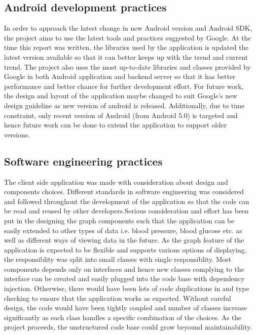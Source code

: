 \subsection{Android development practices}
In order to approach the latest change in new Android version and Android SDK, the project aims to use the latest tools
and practices suggested by Google. At the time this report was written, the libraries used by the application is updated
the latest version available so that it can better keeps up with the trend and current trend. The project also uses the
most up-to-date libraries and classes provided by Google in both Android application and backend server so that it has
better performance and better chance for further development effort.
For future work, the design and layout of the application maybe changed to suit Google's new design guideline as new
version of android is released. Additionally, due to time constraint, only recent version of Android (from Android 5.0)
is targeted and hence future work can be done to extend the application to support older versions.

\subsection{Software engineering practices}
The client side application was made with consideration about design and components choices. Different standards in
software engineering was considered and followed throughout the development of the application so that the code can be
read and reused by other developers.Serious consideration and effort has been put in the designing the graph components
such that the application can be easily extended to other types of data i.e. blood pressure, blood glucose etc. as well
as different ways of viewing data in the future. As the graph feature of the application is expected to be flexible and
supports various options of displaying, the responsiblity was split into small classes with single responsiblity.
Most components depends only on interfaces and hence new classes complying to the interface can be created and easily
plugged into the code base with dependency injection. Otherwise, there would have been lots of code duplications in and
type checking to ensure that the application works as expected. Without careful design, the code would have been tightly
coupled and number of classes increase significantly as each class handles a specific combination of the choices. As the
project proceeds, the unstructured code base could grow beyound maintainability.

